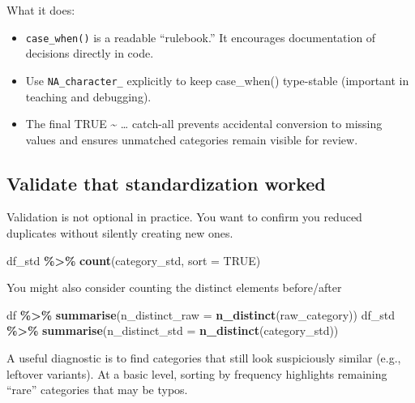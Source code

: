 \documentclass[
  11pt,
]{article}
\newenvironment{Shaded}{\begin{snugshade}}{\end{snugshade}}
\newcommand{\AttributeTok}[1]{\textcolor[rgb]{0.13,0.29,0.53}{#1}}
\newcommand{\ConstantTok}[1]{\textcolor[rgb]{0.56,0.35,0.01}{#1}}
\newcommand{\FunctionTok}[1]{\textcolor[rgb]{0.13,0.29,0.53}{\textbf{#1}}}
\newcommand{\NormalTok}[1]{#1}
\newcommand{\SpecialCharTok}[1]{\textcolor[rgb]{0.81,0.36,0.00}{\textbf{#1}}}
\providecommand{\tightlist}{%
  \setlength{\itemsep}{0pt}\setlength{\parskip}{0pt}}
\begin{document}
What it does:

\begin{itemize}
\tightlist
\item
  \texttt{case\_when()} is a readable ``rulebook.'' It encourages
  documentation of decisions directly in code.
\item
  Use \texttt{NA\_character\_} explicitly to keep case\_when()
  type-stable (important in teaching and debugging).
\item
  The final TRUE \textasciitilde{} \ldots{} catch-all prevents
  accidental conversion to missing values and ensures unmatched
  categories remain visible for review.
\end{itemize}

\subsection{Validate that standardization
worked}\label{validate-that-standardization-worked}

Validation is not optional in practice. You want to confirm you reduced
duplicates without silently creating new ones.

\begin{Shaded}
\begin{Highlighting}[]
\NormalTok{df\_std }\SpecialCharTok{\%\textgreater{}\%}
  \FunctionTok{count}\NormalTok{(category\_std, }\AttributeTok{sort =} \ConstantTok{TRUE}\NormalTok{)}
\end{Highlighting}
\end{Shaded}

You might also consider counting the distinct elements before/after

\begin{Shaded}
\begin{Highlighting}[]
\NormalTok{df }\SpecialCharTok{\%\textgreater{}\%} \FunctionTok{summarise}\NormalTok{(}\AttributeTok{n\_distinct\_raw =} \FunctionTok{n\_distinct}\NormalTok{(raw\_category))}
\NormalTok{df\_std }\SpecialCharTok{\%\textgreater{}\%} \FunctionTok{summarise}\NormalTok{(}\AttributeTok{n\_distinct\_std =} \FunctionTok{n\_distinct}\NormalTok{(category\_std))}
\end{Highlighting}
\end{Shaded}

A useful diagnostic is to find categories that still look suspiciously
similar (e.g., leftover variants). At a basic level, sorting by
frequency highlights remaining ``rare'' categories that may be typos.
\end{document}
